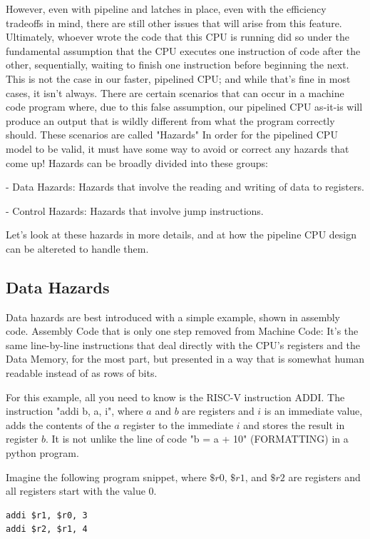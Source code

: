 \documentclass[12pt,twoside]{reedthesis}
\begin{document}
However, even with pipeline and latches in place, even with the efficiency tradeoffs in mind, there are still other issues that will arise from this feature. Ultimately, whoever wrote the code that this CPU is running did so under the fundamental assumption that the CPU executes one instruction of code after the other, sequentially, waiting to finish one instruction before beginning the next. This is not the case in our faster, pipelined CPU; and while that's fine in most cases, it isn't always. There are certain scenarios that can occur in a machine code program where, due to this false assumption, our pipelined CPU as-it-is will produce an output that is wildly different from what the program correctly should. These scenarios are called "Hazards" In order for the pipelined CPU model to be valid, it must  have some way to avoid or correct any hazards that come up! Hazards can be broadly divided into these groups:

- Data Hazards: Hazards that involve the reading and writing of data to registers.

- Control Hazards: Hazards that involve jump instructions.


Let's look at these hazards in more details, and at how the pipeline CPU design can be altereted to handle them.

\subsection{Data Hazards}

Data hazards are best introduced with a simple example, shown in assembly code. Assembly Code that is only one step removed from Machine Code: It's the same line-by-line instructions that deal directly with the CPU's registers and the Data Memory, for the most part, but presented in a way that is somewhat human readable instead of as rows of bits.

For this example, all you need to know is the RISC-V instruction ADDI. The instruction "addi b, a, i", where $a$ and $b$ are registers and $i$ is an immediate value, adds the contents of the $a$ register to the immediate $i$ and stores the result in register $b$. It is not unlike the line of code "b = a + 10" (FORMATTING) in a python program.

Imagine the following program snippet, where $\$r0$, $\$r1$, and $\$r2$ are registers and all registers start with the value 0.

\begin{verbatim}
addi $r1, $r0, 3
addi $r2, $r1, 4
\end{verbatim}
\end{document}
